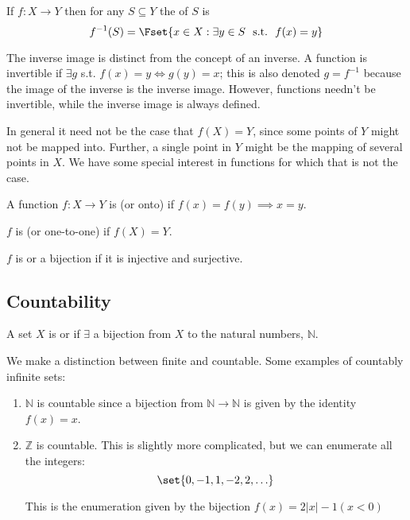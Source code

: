 \documentclass{article}
\begin{document}
\begin{definition}\label{def:lecture1_inverse_image}
  If $f: X \to Y$ then for any $S \subseteq Y$ the  of $S$ is
  \[
    f^{-1}(S)
    =
    \Fset{
      x \in X: \exists y \in S ~~ \text{s.t.} ~~ f(x) = y
    }
  \]
\end{definition}

\begin{remark}
  The inverse image is distinct from the concept of an inverse. A function is invertible if $\exists g$ s.t. $f(x) = y \iff g(y) = x$; this is also denoted $g = f^{-1}$ because the image of the inverse is the inverse image. However, functions needn't be invertible, while the inverse image is always defined.
\end{remark}
In general it need not be the case that $f(X) = Y$, since some points of $Y$ might not be mapped into. Further, a single point in $Y$ might be the mapping of several points in $X$. We have some special interest in functions for which that is not the case.
\begin{definition}[injective]\label{def:lecture1_injective}
  A function $f: X \to Y$ is  (or onto) if $f(x) = f(y) \implies x = y$.
\end{definition}

\begin{definition}[surjective]\label{def:lecture1_surjective}
  $f$ is  (or one-to-one) if $f(X) = Y$.
\end{definition}

\begin{definition}[bijective]\label{def:lecture1_bijective}
  $f$ is  or a bijection if it is injective and surjective.
\end{definition}

\subsection{Countability}
\label{sub:countability}

\begin{definition}[countability]\label{def:lecture1_countable}
  A set $X$ is  or  if $\exists$ a bijection from $X$ to the natural numbers, $\mathbb{N}$.
\end{definition}

We make a distinction between finite and countable. Some examples of countably infinite sets:
\begin{enumerate}
  \item $\mathbb{N}$ is countable since a bijection from $\mathbb{N} \to \mathbb{N}$ is given by the identity $f(x) = x$.

  \item $\mathbb{Z}$ is countable. This is slightly more complicated, but we can enumerate all the integers:
    \[
      \set{0, -1, 1, -2, 2, \ldots}
    \]

    This is the enumeration given by the bijection $f(x) = 2|x| - 1(x < 0)$
\end{enumerate}
\end{document}
